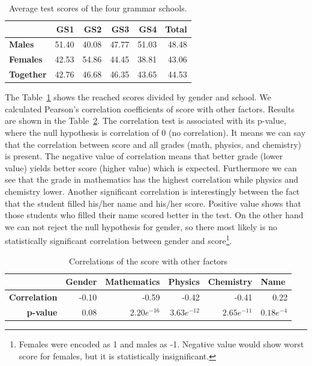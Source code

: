 \begin{table}[htbp]
  \centering
  \caption{Average test scores of the four grammar schools.}
	
	\vspace{3mm}
	
    \begin{tabular}{l|rrrr|r|}
		\hline
    &\textbf{GS1}   & \textbf{GS2} & \textbf{GS3} & \textbf{GS4} & \textbf{Total} \\
					\hline    
    \textbf{Males} & 51.40  & 40.08 & 47.77 & 51.03 & 48.48 \\
    \textbf{Females} & 42.53 & 54.86 & 44.45 & 38.81 & 43.06 \\
		\textbf{Together}&42.76 & 46.68 & 46.35 & 43.65 & 44.53 \\
		\hline
    \end{tabular}%
  \label{tab:totals}%
\end{table}%

The Table~\ref{tab:totals} shows the reached scores divided by gender and school. We calculated Pearson's correlation coefficients of score with other factors. Results are shown in the Table~\ref{tab:corr1}. The correlation test is associated with its p-value, where the null hypothesis is correlation of 0 (no correlation). It means we can say that the correlation between score and all grades (math, physics, and chemistry) is present. The negative value of correlation means that better grade (lower value) yields better score (higher value) which is expected. Furthermore we can see that the grade in mathematics has the highest correlation while physics and chemistry lower. Another significant correlation is interestingly between the fact that the student filled his/her name and his/her score. Positive value shows that those students who filled their name scored better in the test.
On the other hand we can not reject the null hypothesis for gender, so there most likely is no statistically significant correlation between gender and score\footnote{Females were encoded as 1 and males as -1. Negative value would show worst score for females, but it is statistically insignificant.}.

\begin{table}[htbp]%
\caption{Correlations of the score with other factors}
\label{tab:corr1}
\begin{center}
    \begin{tabular}{rrrrrr}
    \hline
    \multicolumn{1}{l}{\textbf{}}  & \multicolumn{1}{l}{\textbf{Gender}} & \multicolumn{1}{l}{\textbf{Mathematics}} & \multicolumn{1}{l}{\textbf{Physics}} & \multicolumn{1}{l}{\textbf{Chemistry}}& \multicolumn{1}{l}{\textbf{Name}} \\
    \hline
    \textbf{Correlation}&  -0.10  & -0.59  & -0.42  & -0.41  & 0.22\\
		\textbf{p-value}&  0.08  & $2.20e^{-16}$  & $3.63e^{-12}$  & $2.65e^{-11}$ & $0.18e^{-4}$ \\
    \hline
    \end{tabular}%
\end{center}
\end{table}

